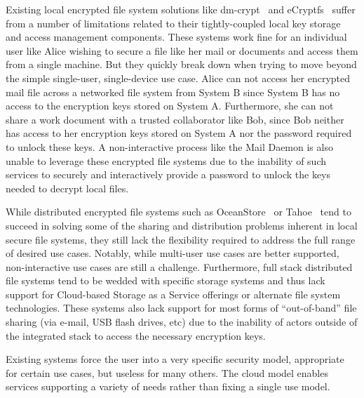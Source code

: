Existing local encrypted file system solutions like
dm-crypt~\cite{dm-crypt} and eCryptfs~\cite{Halcrow} suffer from a
number of limitations related to their tightly-coupled local key
storage and access management components. These systems work fine for an
individual user like Alice wishing to secure a file like her mail or
documents and access them from a single machine. But they quickly
break down when trying to move beyond the simple single-user,
single-device use case. Alice can not access her encrypted mail file
across a networked file system from System B since System B has no
access to the encryption keys stored on System A. Furthermore, she can
not share a work document with a trusted collaborator like Bob,
since Bob neither has access to her encryption keys stored on System A
nor the password required to unlock these keys. A non-interactive
process like the Mail Daemon is also unable to leverage these
encrypted file systems due to the inability of such services to
securely and interactively provide a password to unlock the keys
needed to decrypt local files.


While distributed encrypted file systems such as
OceanStore~\cite{Kubiatowicz2000} or Tahoe~\cite{Wilcox-O'Hearn2008}
tend to succeed in solving some of the sharing and distribution
problems inherent in local secure file systems, they still lack the
flexibility required to address the full range of desired use
cases. 
Notably, while multi-user
use cases are better supported, non-interactive use cases are still a
challenge. Furthermore, full stack distributed file systems tend to be
wedded with specific storage systems and thus lack support for
Cloud-based Storage as a Service offerings or alternate file system
technologies. These systems also lack support for most forms of
``out-of-band'' file sharing (via e-mail, USB flash drives, etc) due
to the inability of actors outside of the integrated stack to access
the necessary encryption keys.

Existing systems force the user into a very specific security model,
appropriate for certain use cases, but useless for many others. 
The cloud model enables services supporting a variety of needs 
rather than fixing a single use model.

